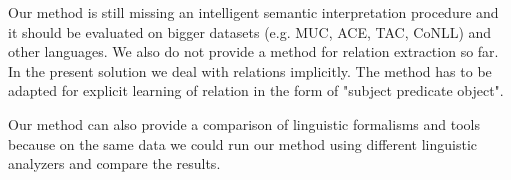 \documentclass[runningheads,a4paper]{llncs}
\begin{document}
Our method is still missing an intelligent semantic interpretation procedure and it should be evaluated on bigger datasets (e.g. MUC, ACE, TAC, CoNLL) and other languages. We also do not provide a method for relation extraction so far. In the present solution we deal with relations implicitly. The method has to be adapted for explicit learning of relation in the form of "subject predicate object".

Our method can also provide a comparison of linguistic formalisms and tools because on the same data we could run our method using different linguistic analyzers and compare the results.



%
%
%
%
%
\end{document}
